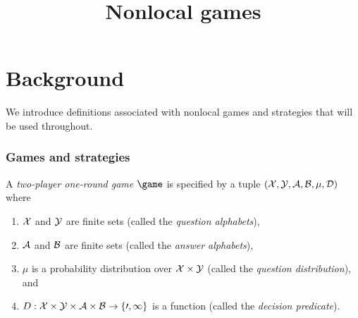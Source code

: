 

\usepackage{marginnote}


\part{Background}
\hypertarget{0005}{}
\reversemarginpar{}
\label{book-part-background}


\title{Nonlocal games}
\hypertarget{0006}{}
\reversemarginpar{}
\label{nonlocalgames}

\maketitle


\tableofcontents


We introduce definitions associated with nonlocal games and strategies that will
be used throughout.

\hypertarget{0007}{}
\reversemarginpar{}
\section{Games and strategies}
\label{section-strat}

\begin{definition}
\hypertarget{0008}{}
\reversemarginpar{}
  \label{def:game}
  A \emph{two-player one-round game} $\game$ is specified by a tuple
  $(\cal{X}, \cal{Y}, \cal{A}, \cal{B}, \mu, D)$ where
  \begin{enumerate}
  \item $\cal{X}$ and $\cal{Y}$ are finite sets (called the \emph{question
      alphabets}),
  \item $\cal{A}$ and $\cal{B}$ are finite sets (called the \emph{answer
      alphabets}),
  \item $\mu$ is a probability distribution over $\cal{X} \times \cal{Y}$
    (called the \emph{question distribution}), and
  \item $D: \cal{X} \times \cal{Y} \times \cal{A} \times \cal{B} \to \{0,1\}$ is
    a function (called the \emph{decision predicate}).
  \end{enumerate}
\end{definition}

